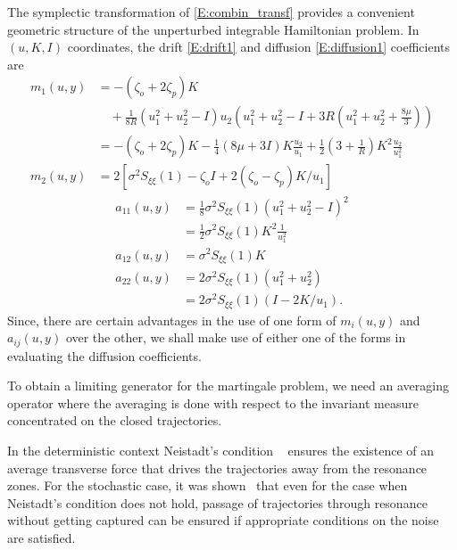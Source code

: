 The symplectic transformation of \eqref{E:combin_transf} provides a convenient geometric structure of the unperturbed integrable Hamiltonian problem. In $(u,K,I)$ coordinates, the drift \eqref{E:drift1} and diffusion \eqref{E:diffusion1} coefficients are
\begin{equation}
\begin{aligned}
m_1(u,y) &= -(\zeta_o + 2\zeta_p) K\\
&\quad + \frac{1}{8 R} \left(u_1^2+u_2^2-I \right) u_2 \left(u_1^2+u_2^2-I + 3 R \left( u_1^2+u_2^2 + \frac{8 \mu}{3} \right) \right) \\
&= -(\zeta_o + 2\zeta_p) K - \frac14 \left(8\mu + 3I\right) K \frac{u_2}{u_1} + \frac12\left(3 + \frac{1}{R}\right)K^2 \frac{u_2}{u_1^2}\\
m_2(u,y) &= 2[\sigma^2 S_{\xi\xi}(1) - \zeta_o I + 2 (\zeta_o - \zeta_p) K/u_1]
\end{aligned}
\label{E:drift2}
\end{equation}
\begin{equation}
\begin{aligned}
a_{11}(u,y) &=\frac{1}{8} \sigma^2 S_{\xi\xi}(1) \left(u_1^2 + u_2^2 - I \right)^2\\
&= \frac12 \sigma^2 S_{\xi\xi}(1) K^2 \frac{1}{u_1^2}\\
a_{12}(u,y) &= \sigma^2 S_{\xi\xi}(1) K\\
a_{22}(u,y) &= 2 \sigma^2S_{\xi\xi}(1) (u_1^2 + u_2^2)\\
&= 2 \sigma^2 S_{\xi\xi}(1) (I - 2 K/u_1).
\end{aligned}
\label{E:diffusion2}
\end{equation}
Since, there are certain advantages in the use of one form of $m_{i}(u,y)$ and $a_{ij}(u,y)$ over the other, we shall make use of either one of the forms in evaluating the diffusion coefficients.

To obtain a limiting generator for the martingale problem, we need an averaging operator where the averaging is done with respect to the invariant measure concentrated on the closed trajectories.

In the deterministic context Neistadt's condition ~\citep{neistadt75:_passag_throug_reson_in_two_frequen_probl, neistadt75:_averag_in_multi_frequen_system,lochak88:_multip_averag_for_class_system} ensures the existence of an average transverse force that drives the trajectories away from the resonance zones. For the stochastic case, it was shown~\citet{ramakrishnan00:_near_reson_motion_of_random} that even for the case when Neistadt's condition does not hold, passage of trajectories through resonance without getting captured can be ensured if appropriate conditions on the noise are satisfied.

